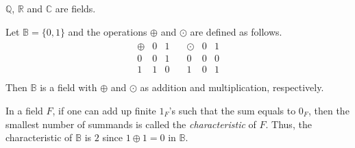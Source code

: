 \begin{example}
  $\mathbb{Q}$, $\mathbb{R}$ and $\mathbb{C}$ are fields.
\end{example}

\begin{example}
  Let $\mathbb{B} = \{0, 1\}$ and the operations $\oplus$ and $\odot$ are
  defined as follows.
  \begin{align*}
    \begin{array}{c|cc}
      \oplus & 0 & 1 \\
      \hline
      0      & 0 & 1 \\
      1      & 1 & 0 \\
    \end{array}
    \quad
    \begin{array}{c|cc}
      \odot & 0 & 1 \\
      \hline
      0     & 0 & 0 \\
      1     & 0 & 1 \\
    \end{array}
  \end{align*}
  Then $\mathbb{B}$ is a field with $\oplus$ and $\odot$ as addition and
  multiplication, respectively.
\end{example}

\begin{remark}
  In a field $F$, if one can add up finite $1_F$'s such that the sum equals to
  $0_F$, then the smallest number of summands is called the
  \emph{characteristic} of $F$.
  Thus, the characteristic of $\mathbb{B}$ is $2$ since $1 \oplus 1 = 0$ in
  $\mathbb{B}$.
\end{remark}

